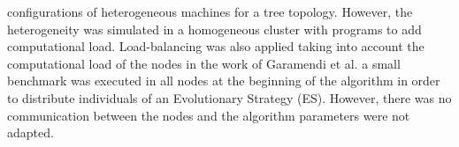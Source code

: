 \documentclass[final,1p,times]{elsarticle}
\begin{document}
 configurations %
 of heterogeneous machines for a tree topology. %
 However, the heterogeneity was simulated in a homogeneous cluster
 with programs to add computational load. %
 Load-balancing was also applied taking into account the computational
 load of the nodes %
 in the work of Garamendi et al. \cite{PARALLELIMPLEMENTATION} a small
 benchmark was executed in all nodes at the beginning of the algorithm
 in order to distribute individuals of an Evolutionary Strategy
 (ES). However, there was no communication between the nodes and the
 algorithm parameters were not adapted.  %
\end{document}
